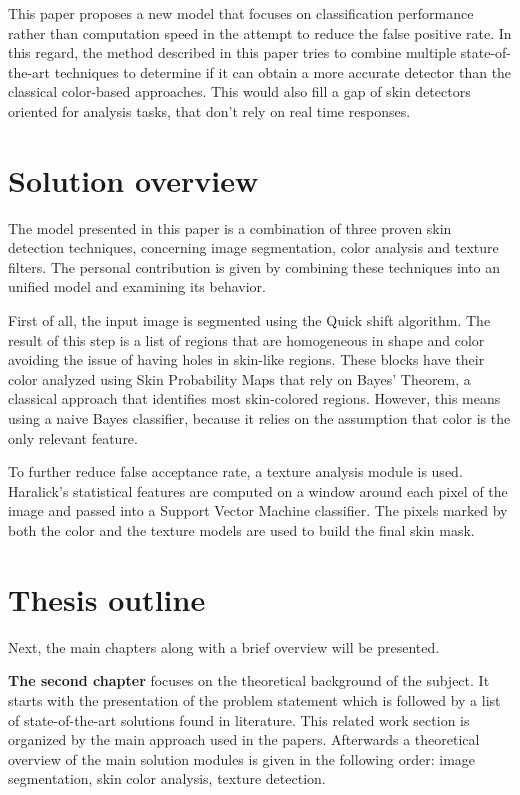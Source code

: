 \documentclass[12pt]{report}
\begin{document}
	This paper proposes a new model that focuses on classification performance rather than computation speed in the attempt to reduce the false positive rate. In this regard, the method described in this paper tries to combine multiple state-of-the-art techniques to determine if it can obtain a more accurate detector than the classical color-based approaches. This would also fill a gap of skin detectors oriented for analysis tasks, that don't rely on real time responses.
	
	\section{Solution overview}
	The model presented in this paper is a combination of three proven skin detection techniques, concerning image segmentation, color analysis and texture filters. The personal contribution is given by combining these techniques into an unified model and examining its behavior.
	
	First of all, the input image is segmented using the Quick shift algorithm. The result of this step is a list of regions that are homogeneous in shape and color avoiding the issue of having holes in skin-like regions. These blocks have their color analyzed using Skin Probability Maps that rely on Bayes' Theorem, a classical approach that identifies most skin-colored regions. However, this means using a naive Bayes classifier, because it relies on the assumption that color is the only relevant feature. 
	
	To further reduce false acceptance rate, a texture analysis module is used. Haralick's statistical features are computed on a window around each pixel of the image and passed into a Support Vector Machine classifier. The pixels marked by both the color and the texture models are used to build the final skin mask.
	
	\section{Thesis outline}
	Next, the main chapters along with a brief overview will be presented.
	
	\textbf{The second chapter} focuses on the theoretical background of the subject. It starts with the presentation of the problem statement which is followed by a list of state-of-the-art solutions found in literature. This related work section is organized by the main approach used in the papers. Afterwards a theoretical overview of the main solution modules is given in the following order: image segmentation, skin color analysis, texture detection.
	
\end{document}

